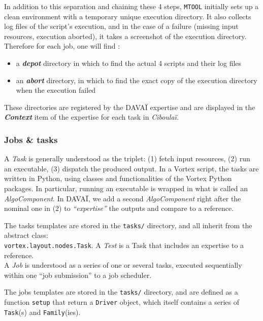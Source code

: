 \documentclass[a4paper,10pt,twoside]{article}
\begin{document}
In addition to this separation and chaining these 4 steps, \texttt{MTOOL} initially sets up a clean environment with a temporary unique execution directory.
It also collects log files of the script's execution, and in the case of a failure (missing input resources, execution aborted), it takes a screenshot of the execution directory.
Therefore for each job, one will find :
\begin{itemize}
 \item a \textit{\textbf{depot}} directory in which to find the actual 4 scripts and their log files
 \item an \textit{\textbf{abort}} directory, in which to find the exact copy of the execution directory when the execution failed
\end{itemize}

\noindent These directories are registered by the DAVAÏ expertise and are displayed in the \textit{\textbf{Context}} item of the expertise for each task in \textit{Ciboulaï}.
 


\subsubsection{Jobs \& tasks}

A \textit{Task} is generally understood as the triplet: (1) fetch input resources, (2) run an executable, (3) dispatch the produced output.
In a Vortex script, the tasks are written in Python, using classes and functionalities of the Vortex Python packages. In particular, running an executable is wrapped in what is called an \textit{AlgoComponent}. In DAVAÏ, we add a second \textit{AlgoComponent} right after the nominal one in (2) to \textit{``expertise''} the outputs and compare to a reference.

The tasks templates are stored in the \texttt{tasks/} directory, and all inherit from the abstract class:\\ \texttt{vortex.layout.nodes.Task}.
A \textit{Test} is a Task that includes an expertise to a reference.\\

A \textit{Job} is understood as a series of one or several tasks, executed sequentially within one ``job submission'' to a job scheduler.

The jobs templates are stored in the \texttt{tasks/} directory, and are defined as a function \texttt{setup} that return a \texttt{Driver} object, which itself contains a series of \texttt{Task}(s) and \texttt{Family}(ies).
\end{document}
